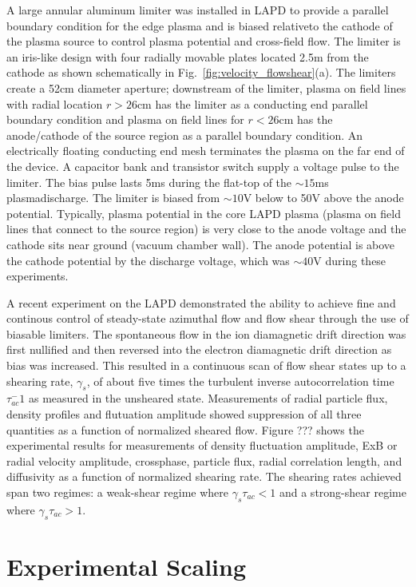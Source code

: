\documentclass[aip,pop,amsmath,amssymb,reprint,superscriptaddress]{revtex4-1} %
\begin{document}
A large annular aluminum limiter was installed in LAPD to provide a parallel boundary condition for the edge plasma and is biased relativeto the cathode of the plasma source to control plasma potential and cross-field flow.  The limiter is an iris-like design with four radially movable plates located 2.5m from the cathode as shown schematically in Fig.~\ref{fig:velocity_flowshear}(a).  The limiters create a 52cm diameter aperture; downstream of the limiter, plasma on field lines with radial location $r>26$cm has the limiter as a conducting end parallel boundary condition and plasma on field lines for $r<26$cm has the anode/cathode of the source region as a parallel boundary condition.  An electrically floating conducting end mesh terminates the plasma on the far end of the device.  A capacitor bank and transistor switch supply a voltage pulse to the limiter.  The bias pulse lasts 5ms during the flat-top of the $\sim$$15$ms plasmadischarge. The limiter is biased from $\sim$$10$V below to 50V above the anode potential.  Typically, plasma potential in the core LAPD plasma (plasma on field lines that connect to the source region) is very close to the anode voltage and the cathode sits near ground (vacuum chamber wall).  The anode potential is above the cathode potential by the discharge voltage, which was $\sim$$40$V during these experiments.

A recent experiment on the LAPD \cite{schaffner12} demonstrated the ability to achieve fine and continous control of steady-state azimuthal flow and flow shear through the use of biasable limiters. The spontaneous flow in the ion diamagnetic drift direction was first nullified and then reversed into the electron diamagnetic drift direction as bias was increased. This resulted in a continuous scan of flow shear states up to a shearing rate, $\gamma_s$, of about five times the turbulent inverse autocorrelation time  $\tau_{ac}^-1$ as measured in the unsheared state. Measurements of radial particle flux, density profiles and flutuation amplitude showed suppression of all three quantities as a function of normalized sheared flow. Figure ??? shows the experimental results for measurements of density fluctuation amplitude, ExB or radial velocity amplitude, crossphase, particle flux, radial correlation length, and diffusivity as a function of normalized shearing rate. The shearing rates achieved span two regimes: a weak-shear regime where $\gamma_{s}\tau_{ac} < 1$ and a strong-shear regime where $\gamma_{s}\tau_{ac} > 1$.

\section{Experimental Scaling}
\end{document}
